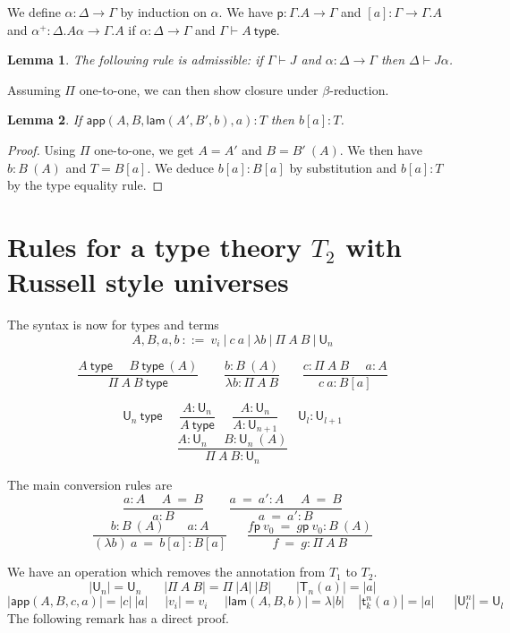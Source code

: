 \documentclass[11pt,a4paper]{article}
\newtheorem{lemma}{Lemma}[theorem]
\theoremstyle{definition}
\newcommand{\conv}{=}
\def\UU{\mathsf{U}}
\newcommand{\type}{\mathsf{type}}
\newcommand{\LAM}{\mathsf{lam}}
\newcommand{\APP}{\mathsf{app}}
\newcommand{\T}{\mathsf{T}}
\newcommand{\sT}{\mathsf{t}}
\newcommand{\pp}{\mathsf{p}}
\begin{document}
 We define $\alpha:\Delta\rightarrow\Gamma$ by induction on $\alpha$.
We have $\pp:\Gamma.A\rightarrow\Gamma$ and $[a]:\Gamma\rightarrow \Gamma.A$ and
$\alpha^+:\Delta.A\alpha\rightarrow\Gamma.A$ if $\alpha:\Delta\rightarrow\Gamma$ and $\Gamma\vdash A~\type$.

\begin{lemma}
  The following rule is admissible: if $\Gamma\vdash J$ and $\alpha:\Delta\rightarrow\Gamma$
  then $\Delta\vdash J\alpha$.
\end{lemma}

Assuming $\Pi$ one-to-one, we can then show closure under $\beta$-reduction.

\begin{lemma}
  If $\APP(A,B,\LAM(A',B',b),a):T$ then $b[a]:T$.
\end{lemma}

\begin{proof}
  Using $\Pi$ one-to-one, we get $A=A'$ and $B=B'~(A)$. We then have $b:B~(A)$ and $T = B[a]$.
  We deduce $b[a]:B[a]$ by substitution and $b[a]:T$ by the type equality rule.
\end{proof}

\section{Rules for a type theory $T_2$ with Russell style universes}

The syntax is now for types and terms
$$
A,B,a,b~::=~v_i~|~c~a~|~\lambda b~|~\Pi~{A}~B~|~\UU_n
$$

$$
\frac{A~\type~~~~~~B~\type~(A)}{\Pi~A~B~\type}~~~~~~~~~
\frac{b:B~(A)}{\lambda b:\Pi~A~B}~~~~~~~~
\frac{c:\Pi~A~B~~~~~~a:A}
     {c~a:B[a]}
$$

$$
\UU_n~\type~~~~~~
\frac{A:\UU_{n}}{A~\type}
~~~~~~\frac{A:\UU_{n}}{A:\UU_{n+1}}
~~~~~~~
{\UU_l}:\UU_{l+1}
$$
$$
\frac{A:\UU_{n}~~~~~~B:\UU_n~(A)}
     {\Pi~A~B:\UU_{n}}$$

The main conversion rules are
$$
\frac{ a:A~~~~~~ A~ \conv~ B}{ a:B}~~~~~~~~~
\frac{ a ~\conv~a':A~~~~~~ A  ~\conv~ B}{ a ~\conv~a':B}
$$
$$
\frac{b:B~(A)~~~~~~~~ a:A}{ (\lambda b)~a  ~\conv~ b[a]:B[a]}
~~~~~~~
\frac{f\pp~v_0 ~\conv~ g\pp~v_0:B~(A)}{ f ~\conv~ g : \Pi~A~B}
$$




\medskip

We have an operation which removes the annotation from $T_1$ to $T_2$.
$$
|\UU_n| = \UU_n~~~~~~~~|\Pi~A~B| = \Pi~|A|~|B|~~~~~~~~~|\T_n(a)| = |a|
$$
$$
|\APP(A,B,c,a)| = |c|~|a|~~~~~~|v_i| = v_i~~~~~~|\LAM(A,B,b)| = \lambda |b|~~~~~|\sT_k^n(a)| = |a|
~~~~~~~|\UU^n_l| = \UU_l
$$
The following remark has a direct proof.
\end{document}
